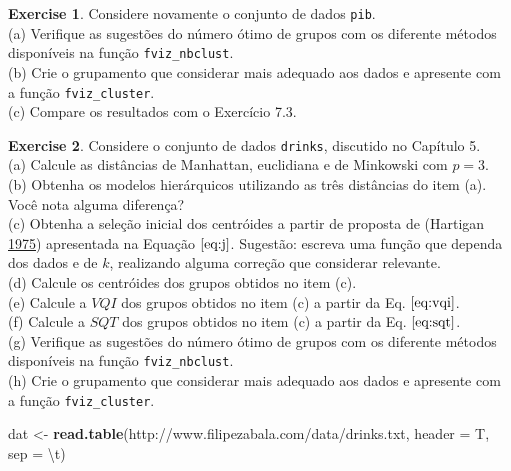 \documentclass[
]{book}
\newenvironment{Shaded}{\begin{snugshade}}{\end{snugshade}}
\newcommand{\CharTok}[1]{\textcolor[rgb]{0.31,0.60,0.02}{#1}}
\newcommand{\DataTypeTok}[1]{\textcolor[rgb]{0.13,0.29,0.53}{#1}}
\newcommand{\KeywordTok}[1]{\textcolor[rgb]{0.13,0.29,0.53}{\textbf{#1}}}
\newcommand{\NormalTok}[1]{#1}
\newcommand{\StringTok}[1]{\textcolor[rgb]{0.31,0.60,0.02}{#1}}
\theoremstyle{definition}
\theoremstyle{definition}
\theoremstyle{definition}
\newtheorem{exercise}{Exercise}[chapter]
\theoremstyle{remark}
\begin{document}
\begin{exercise}
\protect\hypertarget{exr:unnamed-chunk-174}{}{\label{exr:unnamed-chunk-174} }Considere novamente o conjunto de dados \texttt{pib}.\\
(a) Verifique as sugestões do número ótimo de grupos com os diferente métodos disponíveis na função \texttt{fviz\_nbclust}.\\
(b) Crie o grupamento que considerar mais adequado aos dados e apresente com a função \texttt{fviz\_cluster}.\\
(c) Compare os resultados com o Exercício 7.3.
\end{exercise}

\begin{exercise}
\protect\hypertarget{exr:unnamed-chunk-175}{}{\label{exr:unnamed-chunk-175} }Considere o conjunto de dados \texttt{drinks}, discutido no Capítulo 5.\\
(a) Calcule as distâncias de Manhattan, euclidiana e de Minkowski com \(p=3\).\\
(b) Obtenha os modelos hierárquicos utilizando as três distâncias do item (a). Você nota alguma diferença?\\
(c) Obtenha a seleção inicial dos centróides a partir de proposta de (Hartigan \protect\hyperlink{ref-hartigan1975clustering}{1975}) apresentada na Equação \(\eqref{eq:j}\). Sugestão: escreva uma função que dependa dos dados e de \(k\), realizando alguma correção que considerar relevante.\\
(d) Calcule os centróides dos grupos obtidos no item (c).\\
(e) Calcule a \(VQI\) dos grupos obtidos no item (c) a partir da Eq. \(\eqref{eq:vqi}\).\\
(f) Calcule a \(SQT\) dos grupos obtidos no item (c) a partir da Eq. \(\eqref{eq:sqt}\).\\
(g) Verifique as sugestões do número ótimo de grupos com os diferente métodos disponíveis na função \texttt{fviz\_nbclust}.\\
(h) Crie o grupamento que considerar mais adequado aos dados e apresente com a função \texttt{fviz\_cluster}.\\
\end{exercise}

\begin{Shaded}
\begin{Highlighting}[]
\NormalTok{dat \textless{}{-}}\StringTok{ }\KeywordTok{read.table}\NormalTok{(}\StringTok{\textquotesingle{}http://www.filipezabala.com/data/drinks.txt\textquotesingle{}}\NormalTok{, }\DataTypeTok{header =}\NormalTok{ T, }\DataTypeTok{sep =} \StringTok{\textquotesingle{}}\CharTok{\textbackslash{}t}\StringTok{\textquotesingle{}}\NormalTok{)}
\end{Highlighting}
\end{Shaded}
\end{document}
